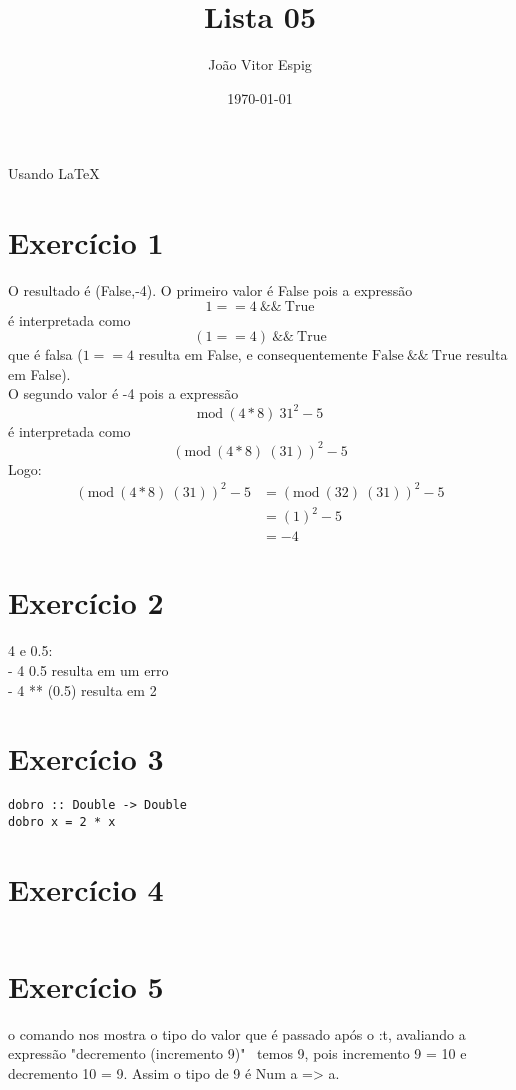 \documentclass[12pt,a4paper,brazil]{article}
\title{Lista 05}
\author{João Vitor Espig}
\date{\today}
\begin{document}
\maketitle
Usando \LaTeX

\section*{Exercício 1}
O resultado é (False,-4).
O primeiro valor é False pois a expressão
$$1 == 4 \ \&\& \ \text{True}$$
é interpretada como
$$(1 == 4) \ \&\& \ \text{True}$$
que é falsa ($1 == 4$ resulta em False,
e consequentemente $\text{False} \ \&\& \ \text{True}$ resulta em False). \\
O segundo valor é -4 pois a expressão
$$\text{mod} \ (4*8) \ 31^2-5$$
é interpretada como
$$(\text{mod} \ (4*8) \ (31))^2-5$$
Logo:
\begin{align*}
(\text{mod} \ (4*8) \ (31))^2-5 & = (\text{mod} \ (32) \ (31))^2-5 \\
                                &= (1)^2 - 5 \\
                                &= -4
\end{align*}
\section*{Exercício 2}
4 e 0.5: \\
- 4 0.5 resulta em um erro \\
- 4 ** (0.5) resulta em 2

\section*{Exercício 3}
\begin{lstlisting}
dobro :: Double -> Double
dobro x = 2 * x
\end{lstlisting}

\section*{Exercício 4}
\begin{lstlisting}
\end{lstlisting}

\section*{Exercício 5}
o comando nos mostra o tipo do valor que é passado após o :t, avaliando a expressão
"decremento (incremento 9)" \ temos 9, pois incremento 9 = 10 e decremento 10 = 9.
Assim o tipo de 9 é Num a => a.
\end{document}
